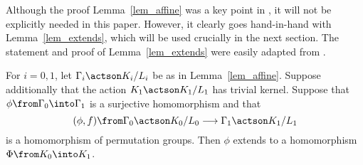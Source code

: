 \documentclass[oneside,leqno,11pt]{amsart}
\begin{document}
Although the proof Lemma~\ref{lem_affine} was a key point in
\cite{quasi}, it will not be explicitly needed in this paper.
However, it clearly goes hand-in-hand with Lemma~\ref{lem_extends},
which will be used crucially in the next section.  The statement and
proof of Lemma~\ref{lem_extends} were easily adapted from
\cite[Proposition~7.2]{furman}.

\begin{lem}
  \label{lem_extends}
  For $i=0,1$, let $\Gamma_i\actson K_i/L_i$ be as in
  Lemma~\ref{lem_affine}.  Suppose additionally that the action
  $K_1\actson K_1/L_1$ has trivial kernel.  Suppose that
  $\phi\from\Gamma_0\into\Gamma_1$ is a surjective homomorphism and
  that
  \[(\phi,f)\from\Gamma_0\actson K_0/L_0\longrightarrow\Gamma_1\actson K_1/L_1
  \]
  is a homomorphism of permutation groups.  Then $\phi$ extends to a
  homomorphism $\Phi\from K_0\into K_1$.
\end{lem}
\end{document}
